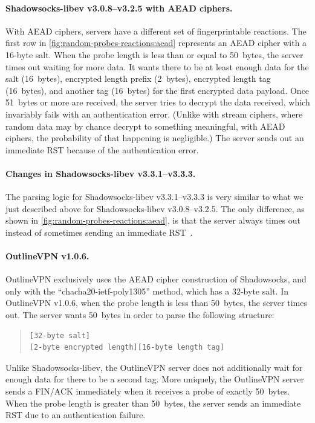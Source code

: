 \documentclass[sigconf,letterpaper]{acmart}
\begin{document}
\paragraph{Shadowsocks-libev v3.0.8--v3.2.5 with AEAD ciphers.}
With AEAD ciphers, servers have a different set of fingerprintable reactions.
The first row in \autoref{fig:random-probes-reactions:aead} represents
an AEAD cipher with a 16-byte salt.
When the probe length is less than or equal to 50~bytes,
the server times out waiting for more data.
It wants there to be at least enough data for the salt (16~bytes),
encrypted length prefix (2~bytes),
encrypted length tag (16~bytes),
and another tag (16~bytes) for the first encrypted data payload.
Once 51~bytes or more are received,
the server tries to decrypt the data received,
which invariably fails with an authentication error.
(Unlike with stream ciphers, where random data may by chance decrypt to something meaningful,
with AEAD ciphers, the probability of that happening is negligible.)
The server sends out an immediate RST because of the authentication error.

\paragraph{Changes in Shadowsocks-libev v3.3.1--v3.3.3.}
The parsing logic for Shadowsocks-libev v3.3.1--v3.3.3 is very similar to what we just described above for Shadowsocks-libev v3.0.8--v3.2.5.
The only difference, as shown in \autoref{fig:random-probes-reactions:aead},
is that the server always times out instead of sometimes sending an immediate RST~\cite{ss-libev-timeout}.

\paragraph{OutlineVPN v1.0.6.}
OutlineVPN exclusively uses the AEAD cipher construction of Shadowsocks,
and only with the ``chacha20-ietf-poly1305'' method, which has a 32-byte salt.
In OutlineVPN v1.0.6,
when the probe length is less than 50~bytes, the server times out.
The server wants 50~bytes in order to parse the following structure:
\begin{quote}
\begin{verbatim}
[32-byte salt]
[2-byte encrypted length][16-byte length tag]
\end{verbatim}
\end{quote}
Unlike Shadowsocks-libev,
the OutlineVPN server does not additionally wait for enough data
for there to be a second tag.
More uniquely, the OutlineVPN server sends a FIN/ACK immediately
when it receives a probe of exactly 50~bytes.
When the probe length is greater than 50~bytes, the server sends an immediate RST due to an authentication failure.
\end{document}
